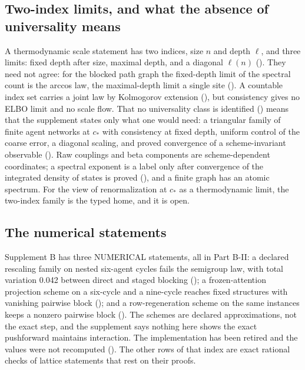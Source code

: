\subsection{Two-index limits, and what the absence of universality means}
\label{comp:sb-universality}

A thermodynamic scale statement has two indices, size \(n\) and depth \(\ell\), and three limits: fixed
depth after size, maximal depth, and a diagonal \(\ell(n)\) (). They need not
agree: for the blocked path graph the fixed-depth limit of the spectral count is the arccos law, the
maximal-depth limit a single site (). A countable index set carries a joint
law by Kolmogorov extension (), but consistency gives no ELBO limit and no
scale flow. That no universality class is identified () means that the
supplement states only what one would need: a triangular family of finite agent networks at \(c_*\) with
consistency at fixed depth, uniform control of the coarse error, a diagonal scaling, and proved convergence
of a scheme-invariant observable (). Raw couplings and beta components are
scheme-dependent coordinates; a spectral exponent is a label only after convergence of the integrated
density of states is proved (), and a finite graph has an atomic
spectrum. For the view of renormalization at \(c_*\) as a thermodynamic limit, the two-index family is the
typed home, and it is open.

\subsection{The numerical statements}
\label{comp:sb-numerical}

Supplement B has three NUMERICAL statements, all in Part B-II: a declared rescaling family on nested
six-agent cycles fails the semigroup law, with total variation 0.042 between direct and staged blocking
(); a frozen-attention projection scheme on a six-cycle and a
nine-cycle reaches fixed structures with vanishing pairwise block
(); and a row-regeneration scheme on the same instances keeps a
nonzero pairwise block (). The schemes are declared
approximations, not the exact step, and the supplement says nothing here shows the exact pushforward
maintains interaction. The implementation has been retired and the values were not recomputed
(). The other rows of that index are exact rational checks of lattice
statements that rest on their proofs.

